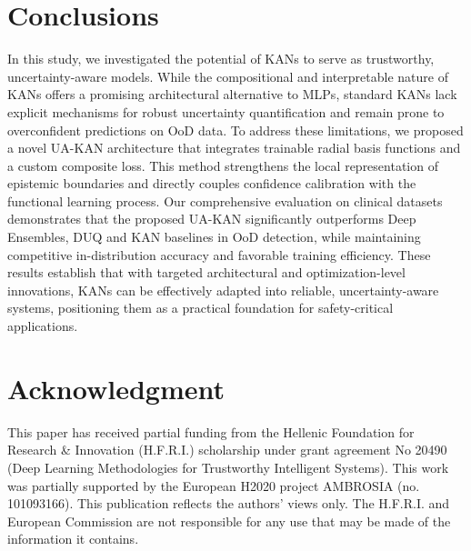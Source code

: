 \documentclass[conference]{IEEEtran}
\begin{document}








\section{Conclusions}

In this study, we investigated the potential of KANs to serve as trustworthy, uncertainty-aware models. While the compositional and interpretable nature of KANs offers a promising architectural alternative to MLPs, standard KANs lack explicit mechanisms for robust uncertainty quantification and remain prone to overconfident predictions on OoD data. To address these limitations, we proposed a novel UA-KAN architecture that integrates trainable radial basis functions and a custom composite loss. This method strengthens the local representation of epistemic boundaries and directly couples confidence calibration with the functional learning process. Our comprehensive evaluation on clinical datasets demonstrates that the proposed UA-KAN significantly outperforms Deep Ensembles, DUQ and KAN baselines in OoD detection, while maintaining competitive in-distribution accuracy and favorable training efficiency. These results establish that with targeted architectural and optimization-level innovations, KANs can be effectively adapted into reliable, uncertainty-aware systems, positioning them as a practical foundation for safety-critical applications.




\section{Acknowledgment}

This paper has received partial funding from the Hellenic Foundation for Research \& Innovation (H.F.R.I.) scholarship under grant agreement No 20490 (Deep Learning Methodologies for Trustworthy Intelligent Systems). This work was partially supported by the European H2020 project AMBROSIA (no. 101093166). This publication reflects the authors’ views only. The H.F.R.I. and European Commission are not responsible for any use that may be made of the information it contains.

\clearpage
\newpage



\end{document}
